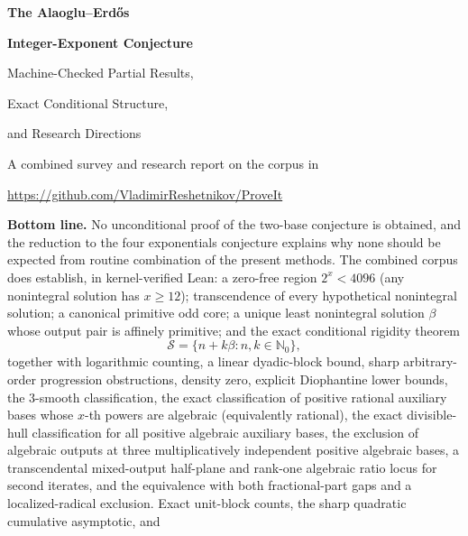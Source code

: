 \documentclass[11pt,oneside]{article}
\theoremstyle{definition}
\theoremstyle{remark}
\newcommand{\Nzero}{\mathbb N_0}
\newcommand{\Sol}{\mathcal S}
\begin{document}

\begin{titlepage}
\centering
\vspace*{1.0cm}
{\Huge\bfseries The Alaoglu--Erd\H{o}s\par}
\vspace{0.25cm}
{\Huge\bfseries Integer-Exponent Conjecture\par}
\vspace{0.65cm}
{\LARGE Machine-Checked Partial Results,\par}
\vspace{0.15cm}
{\LARGE Exact Conditional Structure,\par}
\vspace{0.15cm}
{\LARGE and Research Directions\par}
\vspace{1.05cm}
{\large A combined survey and research report on the corpus in\par}
\vspace{0.15cm}
{\large \url{https://github.com/VladimirReshetnikov/ProveIt}\par}
\vfill
\begin{minipage}{0.88\textwidth}
\small
\textbf{Bottom line.}
No unconditional proof of the two-base conjecture is obtained, and the reduction to the four
exponentials conjecture explains why none should be expected from routine combination of the
present methods.  The combined corpus does establish, in kernel-verified Lean: a zero-free
region $2^x<4096$ (any nonintegral solution has $x\ge12$); transcendence of every hypothetical
nonintegral solution; a canonical primitive odd core; a unique least nonintegral solution
$\beta$ whose output pair is affinely primitive; and the exact conditional rigidity theorem
\[
   \Sol=\{n+k\beta:n,k\in\Nzero\},
\]
together with logarithmic counting, a linear dyadic-block bound, sharp arbitrary-order
progression obstructions, density zero, explicit Diophantine lower bounds, the $3$-smooth
classification, the exact classification of positive rational auxiliary bases whose
$x$-th powers are algebraic (equivalently rational), the exact divisible-hull classification
for all positive algebraic auxiliary bases, the exclusion of algebraic outputs at three
multiplicatively independent positive algebraic bases, a transcendental mixed-output half-plane and rank-one
algebraic ratio locus for second iterates, and the equivalence with both fractional-part gaps and a localized-radical
exclusion.  Exact unit-block counts, the sharp quadratic cumulative asymptotic, and

\end{minipage}
\end{titlepage}
\end{document}
